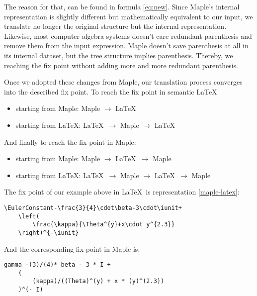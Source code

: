 \documentclass{article}
\newcommand{\iunit}{i}
\newcommand{\EulerConstant}{\gamma}
\begin{document}
The reason for that, can be found in formula \ref{eq:new}. Since Maple's internal representation is slightly different but mathematically equivalent to our input, we translate no longer the original structure but the internal representation. Likewise, most computer algebra systems doesn't care redundant parenthesis and remove them from the input expression. Maple doesn't save parenthesis at all in its internal dataset, but the tree structure implies parenthesis. Thereby, we reaching the fix point without adding more and more redundant parenthesis.

Once we adopted these changes from Maple, our translation process converges into the described fix point. To reach the fix point in semantic \LaTeX
\begin{itemize}
    \item starting from Maple:  Maple   $\rightarrow$ \LaTeX\
    \item starting from \LaTeX: \LaTeX\ $\rightarrow$ Maple   $\rightarrow$ \LaTeX\
\end{itemize}
And finally to reach the fix point in Maple:
\begin{itemize}
    \item starting from Maple:  Maple   $\rightarrow$ \LaTeX\ $\rightarrow$ Maple
    \item starting from \LaTeX: \LaTeX\ $\rightarrow$ Maple   $\rightarrow$ \LaTeX\  $\rightarrow$ Maple
\end{itemize}

\vspace{12pt}
\noindent The fix point of our example above in \LaTeX\ is representation \ref{maple-latex}:
\begin{lstlisting}[mathescape]
\EulerConstant-\frac{3}{4}\cdot\beta-3\cdot\iunit+
    \left(
        \frac{\kappa}{\Theta^{y}+x\cdot y^{2.3}}
    \right)^{-\iunit}
\end{lstlisting}
And the corresponding fix point in Maple is:
\begin{lstlisting}[mathescape]
gamma -(3)/(4)* beta - 3 * I +
    (
        (kappa)/((Theta)^(y) + x * (y)^(2.3))
    )^(- I)
\end{lstlisting}
\end{document}
